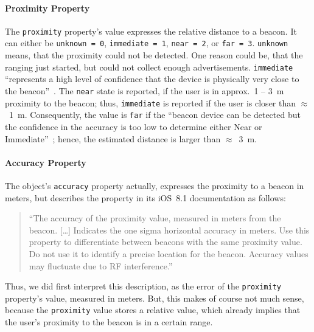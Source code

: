 \paragraph{Proximity Property} The \texttt{proximity} property's value expresses the relative distance to a beacon. It can either be \texttt{unknown = 0}, \texttt{immediate = 1}, \texttt{near = 2}, or \texttt{far = 3}. \texttt{unknown} means, that the proximity could not be detected. One reason could be, that the ranging just started, but could not collect enough advertisements. \texttt{immediate} ``represents a high level of confidence that the device is physically very close to the beacon''~\citep{apple:getting_started}. The \texttt{near} state is reported, if the user is in approx.\ 1 -- 3~m proximity to the beacon; thus, \texttt{immediate} is reported if the user is closer than $\approx$~1~m. Consequently, the value is \texttt{far} if the ``beacon device can be detected but the confidence in the accuracy is too low to determine either Near or Immediate''~\citep{apple:getting_started}; hence, the estimated distance is larger than $\approx$~3~m.

\paragraph{Accuracy Property} The object's \texttt{accuracy} property actually, expresses the proximity to a beacon in meters, but \citet{apple:ios_doc_cl} describes the property in its iOS~8.1 documentation as follows:
\begin{quote}
  ``The accuracy of the proximity value, measured in meters from the beacon.
  [\dots]
  Indicates the one sigma horizontal accuracy in meters. Use this property to differentiate between beacons with the same proximity value. Do not use it to identify a precise location for the beacon. Accuracy values may fluctuate due to RF interference.''\citep{apple:ios_doc_cl}
\end{quote}
Thus, we did first interpret this description, as the error of the \texttt{proximity} property's value, measured in meters. But, this makes of course not much sense, because the \texttt{proximity} value stores a relative value, which already implies that the user's proximity to the beacon is in a certain range.

